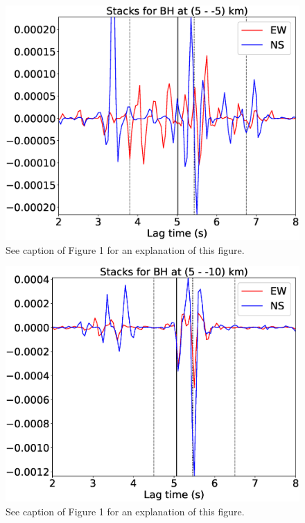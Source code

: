 \documentclass[letterpaper, 12pt]{article}
\begin{document}
\begin{figure}[H]
\includegraphics[width=\linewidth]{figures/intervals/BH_005_-05_stacks.eps}
\caption{See caption of Figure 1 for an explanation of this figure.}
\end{figure}

\begin{figure}[H]
\includegraphics[width=\linewidth]{figures/intervals/BH_005_-10_stacks.eps}
\caption{See caption of Figure 1 for an explanation of this figure.}
\end{figure}
\end{document}
